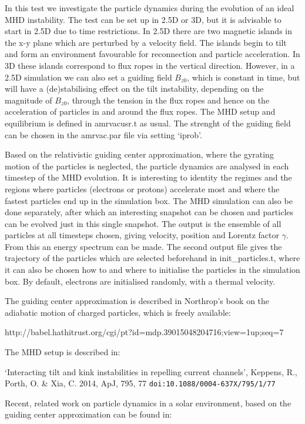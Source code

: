 \documentclass[10pt]{article}
\begin{document}
In this test we investigate the particle dynamics during the evolution of an ideal MHD instability. The test can be set up in 2.5D or 3D, but it is advisable to start in 2.5D due to time restrictions. In 2.5D there are two magnetic islands in the x-y plane which are perturbed by
a velocity field. The islands begin to tilt and form an environment favourable for reconnection and particle acceleration. In 3D these islands correspond to flux ropes in the vertical direction. However, in a 2.5D simulation we can also set a guiding field $B_{z0}$, which is constant in time, but will have
a (de)stabilising effect on the tilt instability, depending on the magnitude of $B_{z0}$, through the tension in the flux ropes and hence on the acceleration of particles in and around the flux ropes. The MHD
setup and equilibrium is defined in amrvacusr.t as usual. The strenght of the guiding field can be chosen in the amrvac.par file via setting `iprob'.

Based on the relativistic guiding center approximation, where the gyrating motion of the particles is neglected, the particle dynamics are analysed in each timestep of the MHD evolution. It is interesting to identity the regimes and the regions where particles (electrons or protons) accelerate most and where the
fastest particles end up in the simulation box. The MHD simulation can also be done separately, after which an interesting snapshot can be chosen and particles can be evolved just in this single snapshot. The output is the ensemble of all particles at all timesteps
chosen, giving velocity, position and Lorentz factor $\gamma$. From this an energy spectrum can be made. The second output file gives the trajectory of the particles
which are selected beforehand in init\_particles.t, where it can also be chosen how to and where to initialise the particles in the simulation box. By default, electrons are initialised randomly, with a thermal velocity.

The guiding center approximation is described in Northrop's book on the adiabatic motion of charged particles, which is freely available:

http://babel.hathitrust.org/cgi/pt?id=mdp.39015048204716;view=1up;seq=7   

The MHD setup is described in:

`Interacting tilt and kink instabilities in repelling current channels', Keppens, R., Porth, O. \& Xia, C. 2014, ApJ, 795, 77 {\tt doi:10.1088/0004-637X/795/1/77 }

Recent, related work on particle dynamics in a solar environment, based on the guiding center approximation can be found in:
\end{document}
